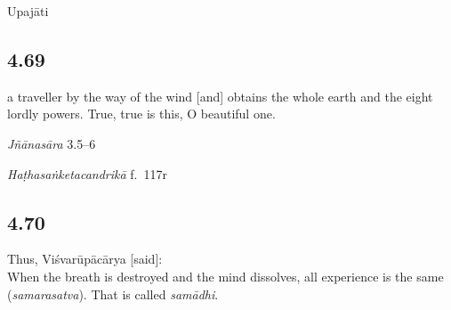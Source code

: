 \begin{ekdosis}

\begin{metre}[hp04_068]
Upajāti
\end{metre}

\subsection*{4.69}
\begin{translation} a traveller by the way of the wind [and] obtains the whole earth and the eight lordly powers. True, true is this, O beautiful one.
\end{translation}

\begin{sources}[hp04_069]
\emph{Jñānasāra} 3.5–6
\begin{versinnote}
\end{versinnote}
\end{sources}

\begin{testimonia}[hp04_069]
\emph{Haṭhasaṅketacandrikā} f.~117r
\begin{versinnote}
\end{versinnote}
\end{testimonia}


\subsection*{4.70}
\begin{translation}[hp04_070]
Thus, Viśvarūpācārya [said]:\\
When the breath is destroyed and the mind dissolves, all experience is the same (\emph{samarasatva}). That is called \emph{samādhi}.
\end{translation}


\end{ekdosis}
